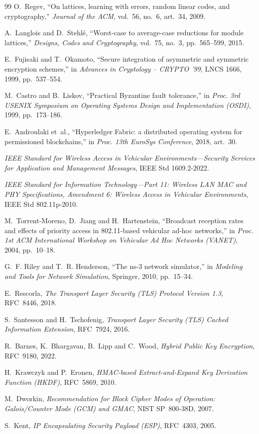 \begin{thebibliography}{99}
 O.~Regev, ``On lattices, learning with errors, random linear codes, and cryptography,'' \emph{Journal of the ACM}, vol.~56, no.~6, art.~34, 2009.

 A.~Langlois and D.~Stehl\'e, ``Worst-case to average-case reductions for module lattices,'' \emph{Designs, Codes and Cryptography}, vol.~75, no.~3, pp.~565--599, 2015.

 E.~Fujisaki and T.~Okamoto, ``Secure integration of asymmetric and symmetric encryption schemes,'' in \emph{Advances in Cryptology -- CRYPTO '99}, LNCS 1666, 1999, pp.~537--554.

 M.~Castro and B.~Liskov, ``Practical Byzantine fault tolerance,'' in \emph{Proc. 3rd USENIX Symposium on Operating Systems Design and Implementation (OSDI)}, 1999, pp.~173--186.

 E.~Androulaki et~al., ``Hyperledger Fabric: a distributed operating system for permissioned blockchains,'' in \emph{Proc. 13th EuroSys Conference}, 2018, art.~30.

 \emph{IEEE Standard for Wireless Access in Vehicular Environments---Security Services for Application and Management Messages}, IEEE Std 1609.2-2022.

 \emph{IEEE Standard for Information Technology---Part 11: Wireless LAN MAC and PHY Specifications, Amendment 6: Wireless Access in Vehicular Environments}, IEEE Std 802.11p-2010.

 M.~Torrent-Moreno, D.~Jiang and H.~Hartenstein, ``Broadcast reception rates and effects of priority access in 802.11-based vehicular ad-hoc networks,'' in \emph{Proc. 1st ACM International Workshop on Vehicular Ad Hoc Networks (VANET)}, 2004, pp.~10--18.

 G.~F. Riley and T.~R. Henderson, ``The ns-3 network simulator,'' in \emph{Modeling and Tools for Network Simulation}, Springer, 2010, pp.~15--34.

 E.~Rescorla, \emph{The Transport Layer Security (TLS) Protocol Version 1.3}, RFC~8446, 2018.

 S.~Santesson and H.~Tschofenig, \emph{Transport Layer Security (TLS) Cached Information Extension}, RFC~7924, 2016.

 R.~Barnes, K.~Bhargavan, B.~Lipp and C.~Wood, \emph{Hybrid Public Key Encryption}, RFC~9180, 2022.

 H.~Krawczyk and P.~Eronen, \emph{HMAC-based Extract-and-Expand Key Derivation Function (HKDF)}, RFC~5869, 2010.

 M.~Dworkin, \emph{Recommendation for Block Cipher Modes of Operation: Galois/Counter Mode (GCM) and GMAC}, NIST SP~800-38D, 2007.

 S.~Kent, \emph{IP Encapsulating Security Payload (ESP)}, RFC~4303, 2005.

\end{thebibliography}
